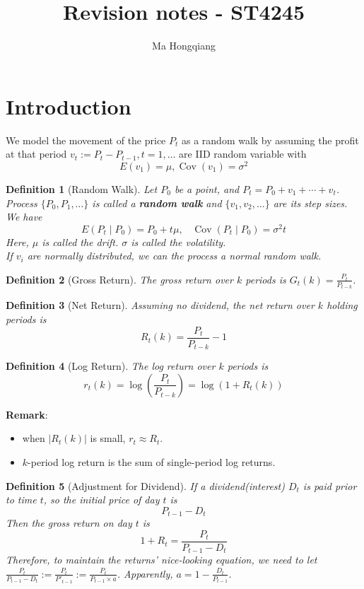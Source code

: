 \documentclass[11pt]{article}
\newtheorem{definition}{Definition}[section]
\theoremstyle{definition}
\DeclareMathOperator{\cov}{Cov}
\begin{document}
\title{Revision notes - ST4245}
\author{Ma Hongqiang}

\twocolumn
\section{Introduction}
We model the movement of the price $P_t$ as a random walk by assuming the profit at that period $v_t:= P_t -P_{t-1}, t= 1,\ldots$ are IID random variable with 
\[
E(v_1) = \mu, \cov(v_1)= \sigma^2
\] 
\begin{definition}[Random Walk]
\normalfont Let $P_0$ be a point, and $P_t= P_0 + v_1 + \cdots + v_t$. Process $\{P_0, P_1, \ldots\}$ is called a \textbf{random walk} and $\{v_1, v_2,\ldots\}$ are its step sizes.\\
We have 
\[
E(P_t\mid P_0) = P_0 + t\mu,\;\;\;\cov(P_t\mid P_0)= \sigma^2 t
\]
Here, $\mu$ is called the drift. $\sigma$ is called the volatility.\\
If $v_i$ are normally distributed, we can the process a \textit{normal} random walk.\\ 
\end{definition}
\begin{definition}[Gross Return]
\normalfont The gross return over $k$ periods is $G_t(k) = \frac{P_t}{P_{t-k}}$.
\end{definition}
\begin{definition}[Net Return]
\normalfont Assuming no dividend, the net return over $k$ holding periods is
\[
R_t(k) = \frac{P_t}{P_{t-k}} - 1
\]
\end{definition}
\begin{definition}[Log Return]
\normalfont The log return over $k$ periods is
\[
r_t(k)=\log(\frac{P_t}{P_{t-k}})=\log(1+R_t(k))
\]
\end{definition}
\textbf{Remark}:
\begin{itemize}
  \item when $|R_t(k)|$ is small, $r_t\approx R_t$.
  \item $k$-period log return is the sum of single-period log returns.
\end{itemize}
\begin{definition}[Adjustment for Dividend]
\normalfont If a dividend(interest) $D_t$ is paid prior to time $t$, so the initial price of day $t$ is 
\[
P_{t-1}-D_t
\]
Then the gross return on day $t$ is
\[
1+R_t=\frac{P_t}{P_{t-1}-D_t}
\]
Therefore, to maintain the returns' nice-looking equation, we need to let $\frac{P_t}{P_{t-1}-D_t}:=\frac{P_t}{P'_{t-1}}:=\frac{P_t}{P_{t-1}\times a}$.
Apparently, $a=1-\frac{D_t}{P_{t-1}}$.
\end{definition}
\end{document}
